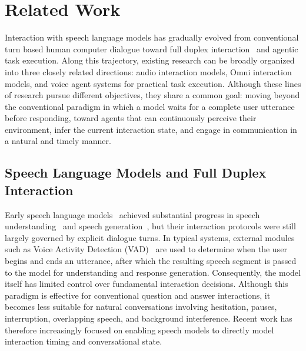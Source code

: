 \section{Related Work}









Interaction with speech language models has gradually evolved from conventional turn based human computer dialogue toward full duplex interaction~\cite{surveyduplex} and agentic task execution. Along this trajectory, existing research can be broadly organized into three closely related directions: audio interaction models, Omni interaction models, and voice agent systems for practical task execution. Although these lines of research pursue different objectives, they share a common goal: moving beyond the conventional paradigm in which a model waits for a complete user utterance before responding, toward agents that can continuously perceive their environment, infer the current interaction state, and engage in communication in a natural and timely manner.

\subsection{Speech Language Models and Full Duplex Interaction} Early speech language models~\cite{ji2024wavchat,an2024funaudiollm,kimiaudio,stepaudio1} achieved substantial progress in speech understanding~\cite{qwenaudio,qwen2audio} and speech generation~\cite{cosyvoice3,controlspeech,ji2024mobilespeech,ji2025wavtokenizer,languagecodec}, but their interaction protocols were still largely governed by explicit dialogue turns. In typical systems, external modules such as Voice Activity Detection (VAD)~\cite{SileroVAD,xu2026fireredasr2s} are used to determine when the user begins and ends an utterance, after which the resulting speech segment is passed to the model for understanding and response generation. Consequently, the model itself has limited control over fundamental interaction decisions. Although this paradigm is effective for conventional question and answer interactions, it becomes less suitable for natural conversations involving hesitation, pauses, interruption, overlapping speech, and background interference. Recent work has therefore increasingly focused on enabling speech models to directly model interaction timing and conversational state.

